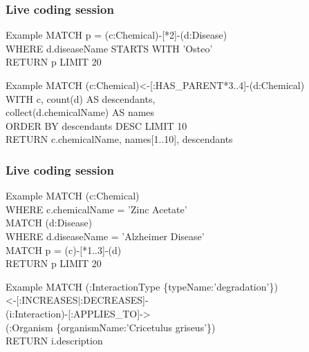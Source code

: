 \documentclass[12pt]{beamer}
\begin{document}
    \begin{frame}
        \frametitle{Live coding session}
        \begin{block}{Example}
            MATCH p = (c:Chemical)-[*2]-(d:Disease)\\
            \hspace{1cm} WHERE d.diseaseName STARTS WITH 'Osteo'\\
            \hspace{1cm} RETURN p LIMIT 20
        \end{block}
        \begin{block}{Example}
            MATCH (c:Chemical)\textless-[:HAS\_PARENT*3..4]-(d:Chemical)\\ 
            \hspace{1cm} WITH c, count(d) AS descendants,\\
            \hspace{1cm} collect(d.chemicalName) AS names\\
            \hspace{1cm} ORDER BY descendants DESC LIMIT 10\\
            RETURN c.chemicalName, names[1..10], descendants
        \end{block}
    \end{frame}
    
    \begin{frame}
        \frametitle{Live coding session}
        \begin{block}{Example}
            MATCH (c:Chemical)\\
            \hspace{1cm} WHERE c.chemicalName = 'Zinc Acetate'\\
            MATCH (d:Disease)\\
            \hspace{1cm} WHERE d.diseaseName = 'Alzheimer Disease'\\
            MATCH p = (c)-[*1..3]-(d)\\
            RETURN p LIMIT 20
        \end{block}
        \begin{block}{Example}
            MATCH (:InteractionType \{typeName:'degradation'\})\\
            \hspace{1cm} \textless-[:INCREASES\(|\):DECREASES]-\\
            \hspace{1cm} (i:Interaction)-[:APPLIES\_TO]-\textgreater\\
            \hspace{1cm} (:Organism \{organismName:'Cricetulus griseus'\})\\
            RETURN i.description
        \end{block}
    \end{frame}
    
\end{document}
